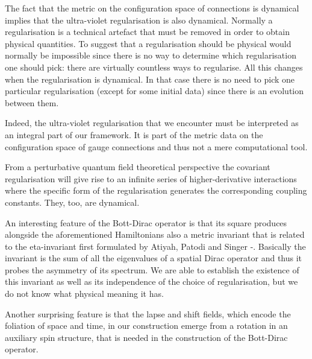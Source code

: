 \documentclass[letterpaper,11pt]{article}
\begin{document}
The fact that the metric on the configuration space of connections is dynamical implies that the ultra-violet regularisation is also dynamical. Normally a regularisation is a technical artefact that must be removed in order to obtain physical quantities. To suggest that a regularisation should be physical would normally be impossible since there is no way to determine which regularisation one should pick: there are virtually countless ways to regularise. All this changes when the regularisation is dynamical. In that case there is no need to pick one particular regularisation (except for some initial data) since there is an evolution between them. 

Indeed, the ultra-violet regularisation that we encounter must be interpreted as an integral part of our framework. It is part of the metric data on the configuration space of gauge connections and thus not a mere computational tool. 

From a perturbative quantum field theoretical perspective the covariant regularisation will give rise to an infinite series of higher-derivative interactions where the specific form of the regularisation generates the corresponding coupling constants. They, too, are dynamical.









An interesting feature of the Bott-Dirac operator is that its square produces alongside the aforementioned Hamiltonians also a metric invariant that is related to the eta-invariant first formulated by Atiyah, Patodi and Singer \cite{Atiyah}-\cite{AtiyahIII}. Basically the invariant is the sum of all the eigenvalues of a spatial Dirac operator and thus it probes the asymmetry of its spectrum. We are able to establish the existence of this invariant as well as its independence of the choice of regularisation, but we do not know what physical meaning it has. 

Another surprising feature is that the lapse and shift fields, which encode the foliation of space and time, in our construction emerge from a rotation in an auxiliary spin structure, that is needed in the construction of the Bott-Dirac operator. 
\end{document}
